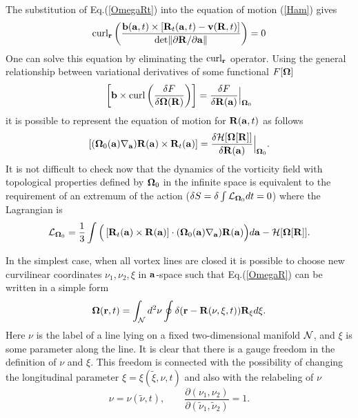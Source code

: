 The substitution of Eq.(\ref{OmegaRt})
into the equation of motion (\ref{Ham}) gives \cite{KR_PRE99}
$$
\mbox{curl}_{\bf r}\left(\frac{{\bf b}({\bf a},t)\times
[{\bf R}_t({\bf a},t)-{\bf v}({\bf R},t)]}
{\mbox{det}\|\partial{\bf R}/\partial{\bf a}\|}\right)=0
$$
One can solve this equation by eliminating the $\mbox{curl}_{\bf r}$ operator.
Using the general relationship between variational derivatives 
of some functional $F[{\bf \Omega }]$
\begin{equation}\label{peresch}
\left[ {\bf b}\times \mbox{curl}\left( \frac{\delta F}{\delta {\bf \Omega }
({\bf R})}\right) \right] =\frac{\delta F}{\delta {\bf R}({\bf a})}
\Big|_{{\bf \Omega }_{0}}  
\end{equation}
it is possible to represent the equation of motion for ${\bf R}({\bf a},t)$ 
as follows
\begin{equation}
\left[ ({\bf \Omega }_{0}({\bf a})\nabla _{{\bf a}}){\bf R}({\bf a})\times
{\bf R}_{t}({\bf a})\right] =
\frac{\delta {\cal H}[{\bf \Omega }[{\bf R}]]}
{\delta {\bf R}({\bf a})}\Big|_{{\bf \Omega }_{0}}.  \label{main}
\end{equation}
It is not difficult to check now that the dynamics of the vorticity field with 
topological properties defined by ${\bf \Omega}_{0}$ in the infinite 
space is equivalent to the requirement of an extremum of the action 
($\delta S=\delta\int {\cal L}_{{\bf \Omega}_{0}}dt=0$) 
where the Lagrangian is \cite{KR98} 
\begin{equation}
{\cal L}_{{\bf \Omega}_{0}}=
\frac{1}{3}\int\Big(\left[ {\bf R}_{t}({\bf a})\times
{\bf R}({\bf a})\right]\cdot({\bf \Omega }_{0}({\bf a})\nabla _{{\bf a}})
{\bf R}({\bf a})\Big)d{\bf a} 
 - {\cal H}[{\bf \Omega }[{\bf R}]].  \label{LAGRANGIAN}
\end{equation}

In the simplest case, when all vortex lines are closed 
it is possible to choose new 
curvilinear coordinates $\nu_1,\nu_2,\xi$ in ${\bf a}$-space such that  
Eq.(\ref{OmegaR}) can be written in a simple form
\begin{equation}\label{lines}
{\bf \Omega }({\bf r},t)=\int_{\cal N}d^2\nu \oint \delta ({\bf r}-
{\bf R}(\nu,\xi,t)){\bf R}_{\xi}d\xi.  
\end{equation}
Here $\nu$ is the label of a line lying on a fixed two-dimensional manifold
${\cal N}$, and $\xi$ is some parameter along the line.
It is clear that there is a gauge freedom in the definition of $\nu$ and $\xi$.
This freedom is connected with the possibility of changing the longitudinal parameter 
$\xi=\xi(\tilde\xi,\nu,t)$ and also with the relabeling of $\nu$
\begin{equation}\label{nu_relabl}
\nu=\nu(\tilde\nu,t),\qquad
\frac{\partial(\nu_1,\nu_2)}
{\partial(\tilde\nu_1,\tilde\nu_2)}=1.
\end{equation}

